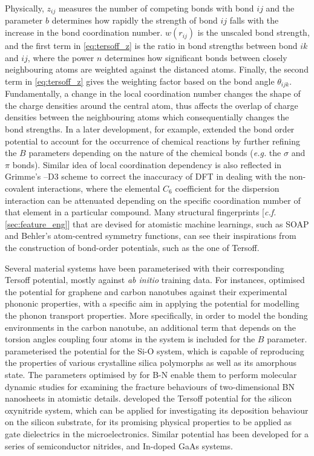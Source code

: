  Physically, $z_{ij}$ measures the number of competing bonds with bond $ij$ and the parameter $b$ determines how rapidly the strength of bond $ij$ falls with the increase in the bond coordination number. $w(r_{ij})$  is the unscaled bond strength, and the first term in \cref{eq:tersoff_z} is the ratio in bond strengths between bond $ik$ and $ij$, where the power $n$ determines how significant bonds between closely neighbouring atoms are weighted against the distanced atoms. Finally, the second term in \cref{eq:tersoff_z} gives the weighting factor based on the bond angle $\theta_{ijk}$. Fundamentally, a change in the local coordination number changes the shape of the charge densities around the central atom, thus affects the overlap of charge densities between the neighbouring atoms which consequentially changes the bond strengths.\cite{abell1985empirical} In a later development, for example, \citet{brenner1990empirical} extended the bond order potential to account for the occurrence of chemical reactions by further refining the $B$ parameters depending on the nature of the chemical bonds (\emph{e.g.} the $\sigma$ and $\pi$ bonds). Similar idea of local coordination dependency is also reflected in Grimme's --D3\cite{grimme2010consistent}  scheme to correct the inaccuracy of DFT in dealing with the non-covalent interactions, where the elemental $C_6$ coefficient for the dispersion interaction can be attenuated depending on the specific coordination number of that element in a particular compound. Many structural fingerprints [\emph{c.f.} \cref{sec:feature_eng}] that are devised for atomistic machine learnings, such as SOAP\cite{bartok2013representing} and Behler's atom-centred symmetry functions,\cite{behler2011atom} can see their inspirations from the construction of bond-order potentials, such as the one of Tersoff.
 
Several material systems have been parameterised with their corresponding Tersoff potential, mostly against \emph{ab initio} training data. For instances, \citet{lindsay2010optimized} optimised the potential for graphene and carbon nanotubes against their experimental phononic properties, with a specific aim in applying the potential for modelling the phonon transport properties. More specifically, in order to model the bonding environments in the carbon nanotube, an additional term that depends on the  torsion angles coupling four atoms in the system is included for the $B$ parameter. \citet{munetoh2007interatomic} parameterised the potential for the Si-O system, which is capable of reproducing the properties of various crystalline silica polymorphs as well as its amorphous state. The parameters optimised by \citet{kumar2016optimised} for  B-N enable them to perform molecular dynamic studies for examining the fracture behaviours of two-dimensional BN nanosheets in atomistic details. \citet{billeter2006ab}  developed the Tersoff potential for the silicon oxynitride system, which can be applied for investigating its deposition behaviour on the silicon substrate, for its promising physical properties to be applied as gate dielectrics in the microelectronics. Similar potential has been developed for a series of semiconductor nitrides,\cite{karaaslan2020assessment} and In-doped GaAs systems.\cite{titantah2007bond}
 
